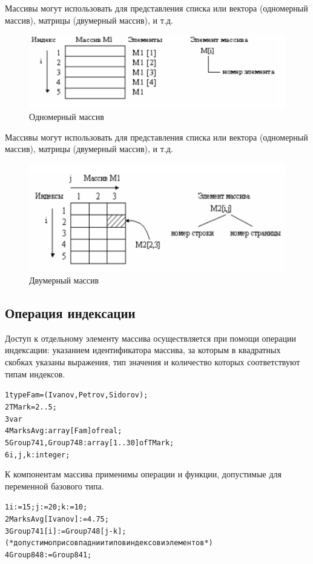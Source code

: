 \documentclass{beamer}
\begin{document}
\begin{frame}
Массивы могут использовать для представления списка или вектора (одномерный массив), матрицы (двумерный массив), и т.д. 
\begin{figure}[h]
\centering
\includegraphics[scale=0.5]{images/one_index.png}
\caption{Одномерный массив}
\label{pic-one-index}
\end{figure}
\end{frame}

\begin{frame}
Массивы могут использовать для представления списка или вектора (одномерный массив), матрицы (двумерный массив), и т.д. 
\begin{figure}[h]
\centering
\includegraphics[scale=0.5]{images/two_index.png}
\caption{Двумерный массив}
\label{pic-two-index}
\end{figure}
\end{frame}

\subsection{Операция индексации}
\begin{frame}[fragile]
Доступ к отдельному элементу массива осуществляется при помощи операции индексации: указанием идентификатора массива, за которым в квадратных скобках указаны выражения, тип значения и количество которых соответствуют типам индексов.
\begin{alltt}
1 type Fam = (Ivanov, Petrov, Sidorov);
2   TMark = 2..5; 
3 var 
4   MarksAvg: array[Fam] of real;
5   Group741, Group748: array[1..30] of TMark;
6   i, j, k: integer;
\end{alltt}
К компонентам массива применимы операции и функции, допустимые для переменной базового типа. 
\begin{alltt}
1 i := 15; j := 20; k := 10;
2 MarksAvg[ Ivanov ] := 4.75;
3 Group741[i] := Group748[j - k];
(* допустимо при совпаднии типов индексов и элементов *)
4 Group848 := Group841; 
\end{alltt}
\end{frame}
\end{document}

